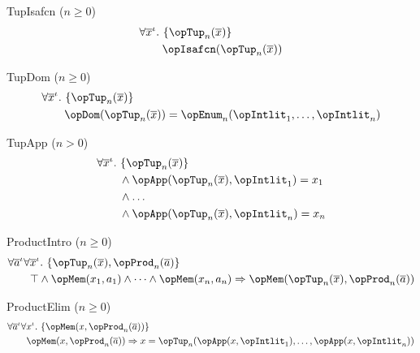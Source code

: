 \documentclass[11pt, a4paper, oneside]{article}
\begin{document}
\begin{axioms}
\item[TupIsafcn ($n \ge 0$)] \[
        \begin{aligned}
            &\forall \overline{x}^\idv.\, \st{ \opTup_n(\overline{x}) } \\
            &\qquad \opIsafcn(\opTup_n(\overline{x}))
        \end{aligned}
    \]

\item[TupDom ($n \ge 0$)] \[
        \begin{aligned}
            &\forall \overline{x}^\idv.\, \st{ \opTup_n(\overline{x}) } \\
            &\qquad \opDom(\opTup_n(\overline{x})) = \opEnum_n(\opIntlit_1, \dots, \opIntlit_n)
        \end{aligned}
    \]

\item[TupApp ($n > 0$)] \[
        \begin{aligned}
            &\forall \overline{x}^\idv.\, \st{ \opTup_n(\overline{x}) } \\
            &\qquad \wedge \opApp(\opTup_n(\overline{x}), \opIntlit_1) = x_1 \\
            &\qquad \wedge \dots \\
            &\qquad \wedge \opApp(\opTup_n(\overline{x}), \opIntlit_n) = x_n
        \end{aligned}
    \]

\item[ProductIntro ($n \ge 0$)] \[
        \begin{aligned}
            &\forall \overline{a}^\idv \forall \overline{x}^\idv.\, \st{ \opTup_n(\overline{x}), \opProd_n(\overline{a}) } \\
            &\qquad \top \wedge \opMem(x_1, a_1) \wedge \dots \wedge \opMem(x_n, a_n) \imp \opMem(\opTup_n(\overline{x}), \opProd_n(\overline{a}))
        \end{aligned}
    \]

\item[ProductElim ($n \ge 0$)] \[
        \begin{aligned}
            &\forall \overline{a}^\idv \forall x^\idv.\, \st{ \opMem(x, \opProd_n(\overline{a})) } \\
            &\qquad \opMem(x, \opProd_n(\overline{a})) \imp x = \opTup_n(\opApp(x, \opIntlit_1), \dots, \opApp(x, \opIntlit_n))
        \end{aligned}
    \]


\end{axioms}
\end{document}
